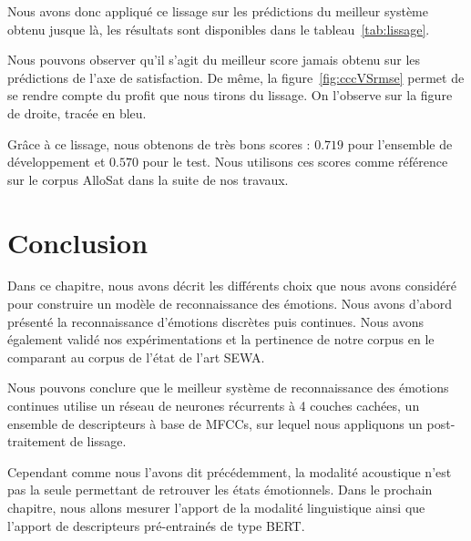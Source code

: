 Nous avons donc appliqué ce lissage sur les prédictions du meilleur système obtenu jusque là, les résultats sont disponibles dans le tableau~\ref{tab:lissage}.



Nous pouvons observer qu'il s'agit du meilleur score jamais obtenu sur les prédictions de l'axe de satisfaction. De même, la figure~\ref{fig:cccVSrmse} permet de se rendre compte du profit que nous tirons du lissage. On l'observe sur la figure de droite, tracée en bleu.

Grâce à ce lissage, nous obtenons de très bons scores : $0.719$ pour l'ensemble de développement et $0.570$ pour le test. Nous utilisons ces scores comme référence sur le corpus AlloSat dans la suite de nos travaux.%


\section{Conclusion}
Dans ce chapitre, nous avons décrit les différents choix que nous avons considéré pour construire un modèle de reconnaissance des émotions. Nous avons d'abord présenté la reconnaissance d'émotions discrètes puis continues. Nous avons également validé nos expérimentations et la pertinence de notre corpus en le comparant au corpus de l'état de l'art SEWA.

Nous pouvons conclure que le meilleur système de reconnaissance des émotions continues utilise un réseau de neurones récurrents à 4 couches cachées, un ensemble de descripteurs à base de MFCCs, sur lequel nous appliquons un post-traitement de lissage.

Cependant comme nous l'avons dit précédemment, la modalité acoustique n'est pas la seule permettant de retrouver les états émotionnels. Dans le prochain chapitre, nous allons mesurer l'apport de la modalité linguistique ainsi que l'apport de descripteurs pré-entrainés de type BERT.
